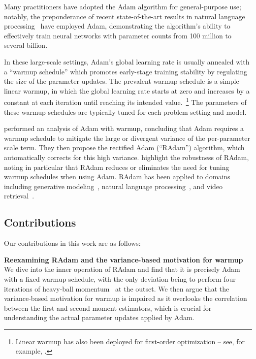 {Many practitioners have adopted the Adam algorithm for general-purpose use; notably, the preponderance of recent state-of-the-art results in natural language processing~\citep{devlin2018bert, radford2019gpt2, liu2019roberta, brown2020gpt3} have employed Adam, demonstrating the algorithm's ability to effectively train neural networks with parameter counts from 100 million to several billion.

In these large-scale settings, Adam's global learning rate is usually annealed with a ``warmup schedule'' which promotes early-stage training stability by regulating the size of the parameter updates. The prevalent warmup schedule is a simple linear warmup, in which the global learning rate starts at zero and increases by a constant at each iteration until reaching its intended value.~\footnote{Linear warmup has also been deployed for first-order optimization -- see, for example, \citet{goyal2017imagenet}.} The parameters of these warmup schedules are typically tuned for each problem setting and model.

\citet{liu2019radam} performed an analysis of Adam with warmup, concluding that Adam requires a warmup schedule to mitigate the large or divergent variance of the per-parameter scale term. They then propose the rectified Adam (``RAdam'') algorithm, which automatically corrects for this high variance. \citeauthor{liu2019radam} highlight the robustness of RAdam, noting in particular that RAdam reduces or eliminates the need for tuning warmup schedules when using Adam. RAdam has been applied to domains including generative modeling~\citep{yamamoto2020parallel}, natural language processing~\citep{nguyen2019trans}, and video retrieval~\citep{liu2019video}.

\subsection*{Contributions}

Our contributions in this work are as follows:

\textbf{Reexamining RAdam and the variance-based motivation for warmup}
\quad
We dive into the inner operation of RAdam and find that it is precisely Adam with a fixed warmup schedule, with the only deviation being to perform four iterations of heavy-ball momentum~\citep{polyak1964momentum} at the outset. We then argue that the variance-based motivation for warmup is impaired as it overlooks the correlation between the first and second moment estimators, which is crucial for understanding the actual parameter updates applied by Adam.

}

